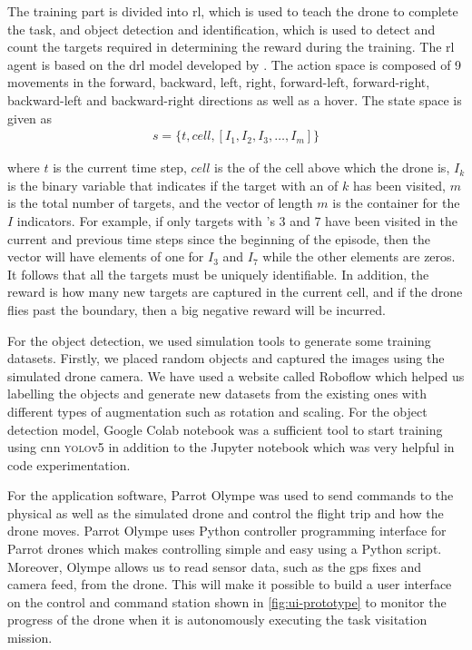 \documentclass[../main.tex]{subfiles}
\begin{document}
The training part is divided into \gls{rl}, 
which is used to teach the \anafi drone to complete the task, 
and object detection and identification, 
which is used to detect and count the targets
required in determining the reward during the training. 
The \gls{rl} agent is based on the \gls{drl} model 
developed by \textcite{Ged21}. The action space is composed 
of 9 movements in the 
forward, backward, left,
right, forward-left, forward-right, backward-left and 
backward-right directions as well as a hover.
The state space is given as
\begin{align}
    s = \{ t, cell, [ I_1, I_2, I_3, \ldots, I_m] \} 
    \label{eq:state-space}
\end{align}

\noindent 
where $t$ is the current time step, $cell$ is the \id of the
cell above which the drone is, $I_k$ is the binary variable 
that indicates if the target with an \id of $k$ has been
visited, $m$ is the total number of targets,
and the vector of length $m$ is the container for the
$I$ indicators. 
For example,
if only targets with \id's 3 and 7 have been visited
in the current and previous time steps since the beginning of the 
episode,
then the vector will have elements of one for $I_3$ and $I_7$ while
the other elements are zeros.
It follows that all the targets must be uniquely identifiable.
In addition, the reward is how many new targets are captured 
in the current cell,
and if the drone flies past the boundary, then a big negative
reward will be incurred.

For the object detection, we used simulation tools to 
generate some training datasets. Firstly, 
we placed random objects and captured the images 
using the simulated drone camera. We have used a 
website called Roboflow which helped us labelling 
the objects and generate new datasets from the 
existing ones with different types of augmentation 
such as rotation and scaling. 
For the object detection model, Google Colab notebook 
was a sufficient tool to start training using 
\gls{cnn} \textsc{yolo}v5 in addition to the 
Jupyter notebook which was very helpful 
in code experimentation. 

For the application software, Parrot Olympe 
was used to send commands to the physical as well as 
the simulated drone and control the flight trip and 
how the drone moves. Parrot Olympe uses Python 
controller programming interface for Parrot drones 
which makes controlling simple and easy using a 
Python script. Moreover, Olympe allows us to read
sensor data, such as the \gls{gps} fixes and camera feed, 
from the \anafi
drone. This will make it possible to build a user interface
on the control and command station
shown in \cref{fig:ui-prototype} to monitor 
the progress of the drone
when it is autonomously executing the task visitation
mission.
\end{document}
